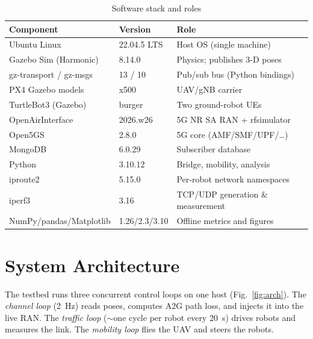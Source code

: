 \documentclass[10pt, conference]{IEEEtran}
\begin{document}
\begin{table}[t]
\caption{Software stack and roles}
\label{tab:software}
\centering
\footnotesize
\begin{tabular}{|l|l|p{3.3cm}|}
\hline
\textbf{Component} & \textbf{Version} & \textbf{Role} \\
\hline
Ubuntu Linux & 22.04.5 LTS & Host OS (single machine) \\
\hline
Gazebo Sim (Harmonic) & 8.14.0 & Physics; publishes 3-D poses \\
\hline
gz-transport / gz-msgs & 13 / 10 & Pub/sub bus (Python bindings) \\
\hline
PX4 Gazebo models & x500 & UAV/gNB carrier \\
\hline
TurtleBot3 (Gazebo) & burger & Two ground-robot UEs \\
\hline
OpenAirInterface & 2026.w26 & 5G NR SA RAN + rfsimulator \\
\hline
Open5GS & 2.8.0 & 5G core (AMF/SMF/UPF/\ldots) \\
\hline
MongoDB & 6.0.29 & Subscriber database \\
\hline
Python & 3.10.12 & Bridge, mobility, analysis \\
\hline
iproute2 & 5.15.0 & Per-robot network namespaces \\
\hline
iperf3 & 3.16 & TCP/UDP generation \& measurement \\
\hline
NumPy/pandas/Matplotlib & 1.26/2.3/3.10 & Offline metrics and figures \\
\hline
\end{tabular}
\end{table}

\section{System Architecture}
\label{sec:arch}
The testbed runs three concurrent control loops on one host (Fig.~\ref{fig:arch}). The \emph{channel loop} (2~Hz) reads poses, computes A2G path loss, and injects it into the live RAN. The \emph{traffic loop} (${\sim}$one cycle per robot every 20~s) drives robots and measures the link. The \emph{mobility loop} flies the UAV and steers the robots.
\end{document}
